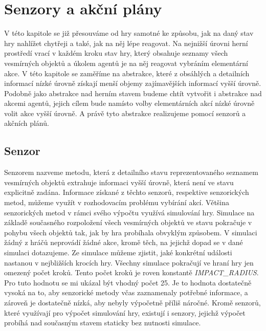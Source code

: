 \chapter{Senzory a akční plány}


V této kapitole se již přesouváme od hry samotné ke způsobu, jak na daný stav hry nahlížet chytřeji a také, jak na něj lépe reagovat. 
Na nejnižší úrovni herní prostředí vrací v každém kroku stav hry, který obsahuje seznamy všech vesmírných objektů a úkolem agentů je na něj reagovat vybráním elementární akce.
V této kapitole se zaměříme na abstrakce, které z obsáhlých a detailních informací nízké úrovně získají menší objemy zajímavějších informací vyšší úrovně. 
Podobně jako abstrakce nad herním stavem budeme chtít vytvořit i abstrakce nad akcemi agentů, jejich cílem bude namísto volby elementárních akcí nízké úrovně volit akce vyšší úrovně.
A právě tyto abstrakce realizujeme pomocí senzorů a akčních plánů.
\section{Senzor}

Senzorem nazveme metodu, která z detailního stavu reprezentovaného seznamem vesmírných objektů extrahuje informaci vyšší úrovně, která není ve stavu explicitně zadána.
Informace získané z těchto senzorů, respektive senzorických metod, můžeme využít v rozhodovacím problému vybírání akcí.
Většina senzorických metod v rámci svého výpočtu využívá simulování hry. 
Simulace na základě současného rozpoložení všech vesmírných objektů ve stavu pokračuje v pohybu všech objektů tak, jak by hra probíhala obvyklým způsobem. 
V simulaci žádný z hráčů neprovádí žádné akce, kromě těch, na jejichž dopad se v dané simulaci dotazujeme.
Ze simulace můžeme zjistit, jaké konkrétní události nastanou v nejbližších krocích hry.
Všechny simulace pokračují ve hraní hry jen omezený počet kroků. Tento počet kroků je roven konstantě \emph{\uppercase{Impact\_radius}}. Pro tuto hodnotu se mi ukázal být vhodný počet 25.
Je to hodnota dostatečně vysoká na to, aby senzorické metody včas zaznamenaly potřebné informace, a zároveň je dostatečně nízká, aby nebyly výpočetně příliš náročné.
Kromě senzorů, které využívají pro výpočet simulování hry, existují i senzory, jejichž výpočet probíhá nad současným stavem staticky bez nutnosti simulace.



